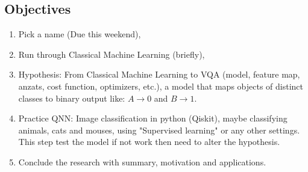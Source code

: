 \subsection{Objectives}
\begin{enumerate}
    \item Pick a name (Due this weekend),
    \item Run through Classical Machine Learning (briefly),
    \item Hypothesis: From Classical Machine Learning to VQA (model, feature map, anzats, cost function, optimizers, etc.), a model that maps objects of distinct classes to binary output like: $A \to 0$ and $B \to 1$.
    \item Practice QNN: Image classification in python (Qiskit), maybe classifying animals, cats and mouses, using "Supervised learning" or any other settings. This step test the model if not work then need to alter the hypothesis.
    \item Conclude the research with summary, motivation and applications.
\end{enumerate}

